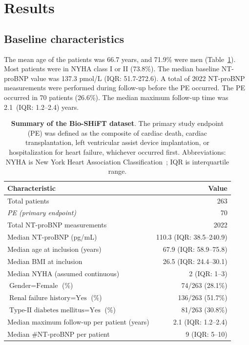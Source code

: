 \section{Results}
\label{c6:sec:results}

\subsection{Baseline characteristics}
The mean age of the patients was 66.7 years, and 71.9\% were men (Table~\ref{c6:table:1}). Most patients were in NYHA class I or II (73.8\%). The median baseline NT-proBNP value was 137.3 pmol/L (IQR: 51.7-272.6). A total of 2022 NT-proBNP measurements were performed during follow-up before the PE occurred. The PE occurred in 70 patients (26.6\%). The median maximum follow-up time was 2.1~(IQR: 1.2--2.4) years.

\begin{table}
\small
\centering
\caption{\textbf{Summary of the Bio-SHiFT dataset}. The primary study endpoint (PE) was defined as the composite of cardiac death, cardiac transplantation, left ventricular assist device implantation, or hospitalization for heart failure, whichever occurred first. Abbreviations: NYHA is New York Heart Association Classification~\citep{bredy2018new}; IQR is interquartile range.}
\label{c6:table:1}
\begin{tabular}{p{8cm}r}
\toprule
\textbf{Characteristic} & Value\\
\midrule
Total patients & 263\\
\emph{PE (primary endpoint)} & 70\\
\midrule
Total NT-proBNP measurements & 2022\\
Median NT-proBNP (pg/mL) & 110.3 (IQR: 38.5--240.9)\\
Median age at inclusion (years) & 67.9 (IQR: 58.9--75.8)\\
Median BMI at inclusion & 26.5 (IQR: 24.4--30.1)\\
Median NYHA (assumed continuous) & 2 (IQR: 1--3)\\
$\mbox{Gender} = \mbox{Female}$ (\%) & 74/263 (28.1\%)\\
$\mbox{Renal failure history} = \mbox{Yes}$ (\%) & 136/263 (51.7\%)\\
$\mbox{Type-II diabetes mellitus} = \mbox{Yes}$ (\%) & 81/263 (30.8\%)\\
\midrule
Median maximum follow-up per patient (years) & 2.1 (IQR: 1.2--2.4)\\
Median \#NT-proBNP per patient & 9 (IQR: 5--10)\\
\bottomrule
\end{tabular}
\end{table}

